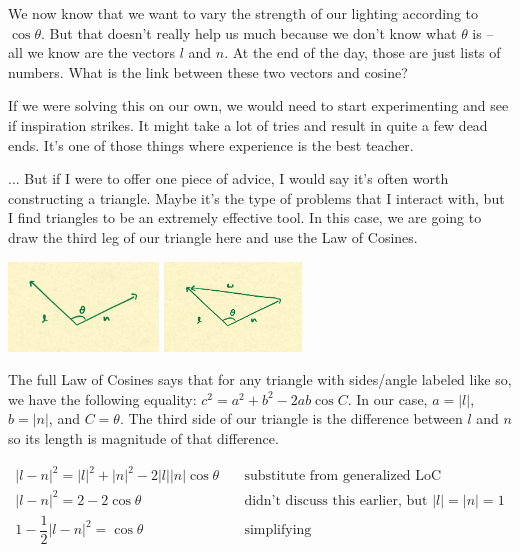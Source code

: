 \documentclass{article}
\begin{document}
We now know that we want to vary the strength of our lighting according to $\cos \theta$.
But that doesn't really help us much because we don't know what $\theta$ is -- all we know are the vectors $l$ and $n$.
At the end of the day, those are just lists of numbers.
What is the link between these two vectors and cosine?

If we were solving this on our own, we would need to start experimenting and see if inspiration strikes.
It might take a lot of tries and result in quite a few dead ends.
It's one of those things where experience is the best teacher.

... But if I were to offer one piece of advice, I would say it's often worth constructing a triangle.
Maybe it's the type of problems that I interact with, but I find triangles to be an extremely effective tool.
In this case, we are going to draw the third leg of our triangle here and use the Law of Cosines.

\begin{center}
	\includegraphics[width=0.3\textwidth,frame]{assets/ln.jpg}
	\hspace{0.2\textwidth}
	\includegraphics[width=0.2735\textwidth,frame]{assets/lnw.jpg}
\end{center}

The full Law of Cosines says that for any triangle with sides/angle labeled like so, we have the following equality: $c^2 = a^2 + b^2 - 2ab \cos C$.
In our case, $a = |l|$, $b = |n|$, and $C = \theta$.
The third side of our triangle is the difference between $l$ and $n$ so its length is magnitude of that difference.

\begin{align*}
|l-n|^2 = |l|^2 + |n|^2 - 2 |l| |n| \cos \theta & \quad \text{substitute from generalized LoC} \\
|l-n|^2 = 2 - 2 \cos \theta & \quad \text{didn't discuss this earlier, but } |l| = |n| = 1 \\
1 - \dfrac{1}{2}|l-n|^2 = \cos \theta & \quad \text{simplifying}
\end{align*}
\end{document}

